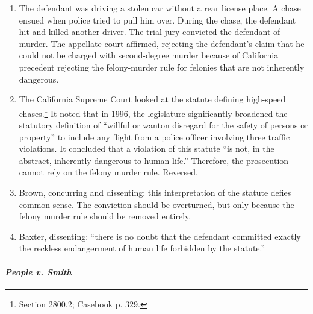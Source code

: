 \begin{enumerate}
    \item The defendant was driving a stolen car without a rear license place. A chase ensued when police tried to pull him over. During the chase, the defendant hit and killed another driver. The trial jury convicted the defendant of murder. The appellate court affirmed, rejecting the defendant's claim that he could not be charged with second-degree murder because of California precedent rejecting the felony-murder rule for felonies that are not inherently dangerous.
    \item The California Supreme Court looked at the statute defining high-speed chases.\footnote{Section 2800.2; Casebook p. 329.} It noted that in 1996, the legislature significantly broadened the statutory definition of ``willful or wanton disregard for the safety of persons or property'' to include any flight from a police officer involving three traffic violations. It concluded that a violation of this statute ``is not, in the abstract, inherently dangerous to human life.'' Therefore, the prosecution cannot rely on the felony murder rule. Reversed.
    \item Brown, concurring and dissenting: this interpretation of the statute defies common sense. The conviction should be overturned, but only because the felony murder rule should be removed entirely.
    \item Baxter, dissenting: ``there is no doubt that the defendant committed exactly the reckless endangerment of human life forbidden by the statute.''
\end{enumerate}

\paragraph{\emph{People v. Smith}}

